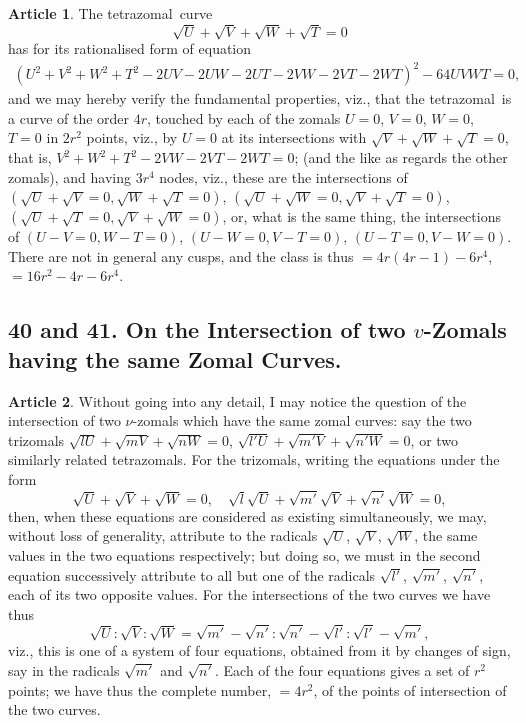 \documentclass[11pt,a4paper]{article}
\theoremstyle{definition}
\newtheorem{art}{Article}
\newcommand{\tetrazomal}{tetrazomal}
\begin{document}
\begin{art}
The \tetrazomal\ curve
\[
\sqrt{U} + \sqrt{V} + \sqrt{W} + \sqrt{T} = 0
\]
has for its rationalised form of equation
\begin{multline*}
(U^{2} + V^{2} + W^{2} + T^{2} - 2UV - 2UW - 2UT - 2VW - 2VT - 2WT)^{2} - 64UVWT = 0,
\end{multline*}
and we may hereby verify the fundamental properties, viz., that the \tetrazomal\ is a curve of the order $4r$, touched by each of the zomals $U = 0$, $V = 0$, $W = 0$, $T = 0$ in $2r^{2}$ points, viz., by $U = 0$ at its intersections with $\sqrt{V} + \sqrt{W} + \sqrt{T} = 0$, that is, $V^{2} + W^{2} + T^{2} - 2VW - 2VT - 2WT = 0$; (and the like as regards the other zomals), and having $3r^{4}$ nodes, viz., these are the intersections of $(\sqrt{U} + \sqrt{V} = 0, \sqrt{W} + \sqrt{T} = 0)$, $(\sqrt{U} + \sqrt{W} = 0, \sqrt{V} + \sqrt{T} = 0)$, $(\sqrt{U} + \sqrt{T} = 0, \sqrt{V} + \sqrt{W} = 0)$, or, what is the same thing, the intersections of $(U - V = 0, W - T = 0)$, $(U - W = 0, V - T = 0)$, $(U - T = 0, V - W = 0)$. There are not in general any cusps, and the class is thus $= 4r(4r - 1) - 6r^{4}$, $= 16r^{2} - 4r - 6r^{4}$.
\end{art}

\subsection*{40 and 41. On the Intersection of two $v$-Zomals having the same Zomal Curves.}

\begin{art}
Without going into any detail, I may notice the question of the intersection of two $\nu$-zomals which have the same zomal curves: say the two trizomals $\sqrt{lU} + \sqrt{mV} + \sqrt{nW} = 0$, $\sqrt{l'U} + \sqrt{m'V} + \sqrt{n'W} = 0$, or two similarly related tetrazomals. For the trizomals, writing the equations under the form
\[
\sqrt{U} + \sqrt{V} + \sqrt{W} = 0, \quad \sqrt{l}\sqrt{U} + \sqrt{m'}\sqrt{V} + \sqrt{n'}\sqrt{W} = 0,
\]
then, when these equations are considered as existing simultaneously, we may, without loss of generality, attribute to the radicals $\sqrt{U}$, $\sqrt{V}$, $\sqrt{W}$, the same values in the two equations respectively; but doing so, we must in the second equation successively attribute to all but one of the radicals $\sqrt{l'}$, $\sqrt{m'}$, $\sqrt{n'}$, each of its two opposite values. For the intersections of the two curves we have thus
\[
\sqrt{U} : \sqrt{V} : \sqrt{W} = \sqrt{m'} - \sqrt{n'} : \sqrt{n'} - \sqrt{l'} : \sqrt{l'} - \sqrt{m'},
\]
viz., this is one of a system of four equations, obtained from it by changes of sign, say in the radicals $\sqrt{m'}$ and $\sqrt{n'}$. Each of the four equations gives a set of $r^{2}$ points; we have thus the complete number, $= 4r^{2}$, of the points of intersection of the two curves.
\end{art}
\end{document}
